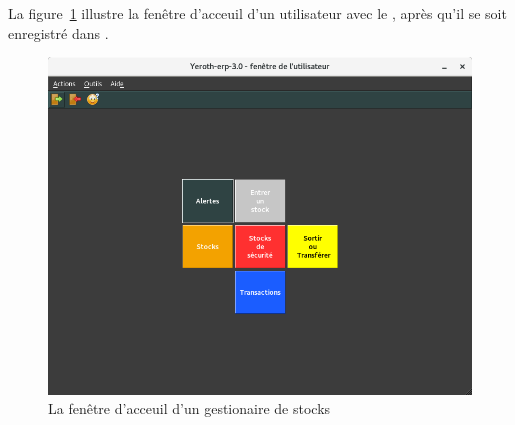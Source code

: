 \label{sec:utilisateurs-gestionairedestocks}

La figure~\ref{fig:yeren-fenetre-gestionairedestocks} illustre
la fen\^etre d'acceuil d'un utilisateur avec le \role \gestionairedestocks, 
apr\`es qu'il se soit enregistr\'e dans \yeren.\\

\begin{figure}[!htbp]
\centering
\includegraphics[scale=0.63]{images/yeren-fenetre-gestionairedestocks.png}
\caption{La fen\^etre d'acceuil d'un gestionaire de stocks}
\label{fig:yeren-fenetre-gestionairedestocks}
\end{figure}